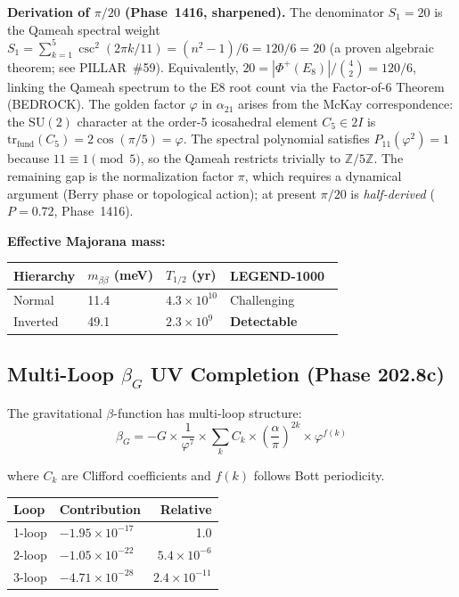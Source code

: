 \documentclass[aps,prd,twocolumn,superscriptaddress,floatfix,nofootinbib]{revtex4-2}
\theoremstyle{definition}
\theoremstyle{remark}
\newcommand{\vp}{\varphi}
\begin{document}
\textbf{Derivation of $\pi/20$ (Phase~1416, sharpened).}
The denominator $S_1 = 20$ is the Qameah spectral weight
$S_1 = \sum_{k=1}^{5}\csc^2(2\pi k/11) = (n^2-1)/6 = 120/6 = 20$
(a proven algebraic theorem; see PILLAR~\#59).
Equivalently, $20 = |\Phi^+(E_8)|/\binom{4}{2} = 120/6$, linking the Qameah
spectrum to the E8 root count via the Factor-of-6 Theorem (BEDROCK).
The golden factor $\vp$ in $\alpha_{21}$ arises from the McKay correspondence:
the $\mathrm{SU}(2)$ character at the order-5 icosahedral element $C_5\in 2I$ is
$\mathrm{tr}_{\mathrm{fund}}(C_5) = 2\cos(\pi/5) = \vp$.
The spectral polynomial satisfies $P_{11}(\vp^2)=1$ because $11\equiv 1\pmod{5}$,
so the Qameah restricts trivially to $\mathbb{Z}/5\mathbb{Z}$.
The remaining gap is the normalization factor $\pi$, which requires a
dynamical argument (Berry phase or topological action); at present $\pi/20$
is \emph{half-derived} ($P=0.72$, Phase~1416).

\textbf{Effective Majorana mass:}
\begin{center}
\small
\begin{tabular}{llll}
\toprule
Hierarchy & $m_{\beta\beta}$ (meV) & $T_{1/2}$ (yr) & LEGEND-1000~\cite{legend} \\
\midrule
Normal & 11.4 & $4.3\times10^{10}$ & Challenging \\
Inverted & 49.1 & $2.3\times10^{9}$ & \textbf{Detectable} \\
\bottomrule
\end{tabular}
\end{center}

\subsection{Multi-Loop $\beta_G$ UV Completion (Phase 202.8c)}

The gravitational $\beta$-function has multi-loop structure:
\begin{equation}
\beta_G = -G \times \frac{1}{\vp^7} \times \sum_k C_k \times \left(\frac{\alpha}{\pi}\right)^{2k} \times \vp^{f(k)}
\end{equation}

where $C_k$ are Clifford coefficients and $f(k)$ follows Bott periodicity.

\begin{center}
\small
\begin{tabular}{llr}
\toprule
Loop & Contribution & Relative \\
\midrule
1-loop & $-1.95\times10^{-17}$ & 1.0 \\
2-loop & $-1.05\times10^{-22}$ & $5.4\times10^{-6}$ \\
3-loop & $-4.71\times10^{-28}$ & $2.4\times10^{-11}$ \\
\bottomrule
\end{tabular}
\end{center}
\end{document}
